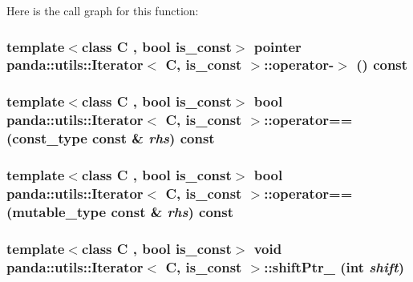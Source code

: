 Here is the call graph for this function:\hypertarget{classpanda_1_1utils_1_1Iterator_ae491214ded1d0a34ec3a4931da38a90e}{
\subsubsection[{operator-\/$>$}]{\setlength{\rightskip}{0pt plus 5cm}template$<$class C , bool is\_\-const$>$ {\bf pointer} {\bf panda::utils::Iterator}$<$ C, is\_\-const $>$::operator-\/$>$ () const}}
\label{classpanda_1_1utils_1_1Iterator_ae491214ded1d0a34ec3a4931da38a90e}
\hypertarget{classpanda_1_1utils_1_1Iterator_a5ae13156bc0d6d19dcc81bce8df39bae}{
\subsubsection[{operator==}]{\setlength{\rightskip}{0pt plus 5cm}template$<$class C , bool is\_\-const$>$ bool {\bf panda::utils::Iterator}$<$ C, is\_\-const $>$::operator== ({\bf const\_\-type} const \& {\em rhs}) const}}
\label{classpanda_1_1utils_1_1Iterator_a5ae13156bc0d6d19dcc81bce8df39bae}
\hypertarget{classpanda_1_1utils_1_1Iterator_a9cab267a4d1b5a471bc6540bdc995463}{
\subsubsection[{operator==}]{\setlength{\rightskip}{0pt plus 5cm}template$<$class C , bool is\_\-const$>$ bool {\bf panda::utils::Iterator}$<$ C, is\_\-const $>$::operator== ({\bf mutable\_\-type} const \& {\em rhs}) const}}
\label{classpanda_1_1utils_1_1Iterator_a9cab267a4d1b5a471bc6540bdc995463}
\hypertarget{classpanda_1_1utils_1_1Iterator_affba4c52306259cfae7010b896f2747c}{
\subsubsection[{shiftPtr\_\-}]{\setlength{\rightskip}{0pt plus 5cm}template$<$class C , bool is\_\-const$>$ void {\bf panda::utils::Iterator}$<$ C, is\_\-const $>$::shiftPtr\_\- (int {\em shift})}}
\label{classpanda_1_1utils_1_1Iterator_affba4c52306259cfae7010b896f2747c}


